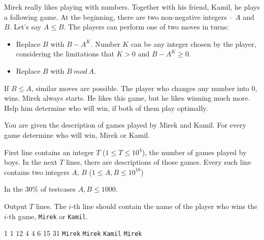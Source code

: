 





Mirek really likes playing with numbers. Together with his friend, Kamil, he plays a following game. At the beginning, there are two
non-negative integers -- $A$ and $B$. Let's say $A \leqslant B$. The players can perform one of two moves in turns:

\begin{itemize}
	\item Replace $B$ with $B - A^K$. Number $K$ can be any integer chosen by the player, considering the limitations that $K > 0$
	      and $B - A^K \ge 0$.
	\item Replace $B$ with $B\ mod\ A$. 
\end{itemize}

If $B \leqslant A$, similar moves are possible. The player who changes any number into $0$, wins. Mirek always starts. He likes this game, but he likes winning much more. Help him determine who will win, if both of them play optimally.


You are given the description of games played by Mirek and Kamil. For every game determine who will win, Mirek or Kamil.


First line contains an integer $T$ ($1 \le T \le 10^4$), the number of games played by boys.
In the next $T$ lines, there are descriptions of those games.
Every such line contains two integers $A$, $B$ ($1 \le A, B \le 10^{18}$) 
\smallskip

In the $30\%$ of testcases $A,B \le 1000$.


Output $T$ lines. The $i$-th line should contain the name of the player who wins the $i$-th game, \texttt{Mirek} or \texttt{Kamil}.


1 1
12 4
4 6
15 31
\sampleOUT
\texttt{Mirek}
\texttt{Mirek}
\texttt{Kamil}
\texttt{Mirek}
\sampleEND


